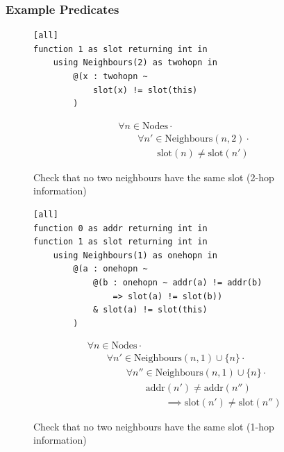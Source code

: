 \subsubsection{Example Predicates}
\label{sec:example-predicates}

\begin{figure}[H]
\begin{minipage}{.5\linewidth}
\begin{lstlisting}[language=Hoppy]
[all]
function 1 as slot returning int in
    using Neighbours(2) as twohopn in
        @(x : twohopn ~
            slot(x) != slot(this)
        )
\end{lstlisting}
\end{minipage}%
\begin{minipage}{.5\linewidth}
\begin{align*}
&				\forall n \in \text{Nodes} \cdot \\
& \hspace{2em}		\forall n' \in \text{Neighbours}(n, 2) \cdot \\
& \hspace{4em}				\text{slot}(n) \neq \text{slot}(n')
\end{align*}
\end{minipage}

\caption{Check that no two neighbours have the same slot (2-hop information)}
\label{fig:two-hop-slot-pred-lang}
\end{figure}

\begin{figure}[H]
\begin{minipage}{.5\linewidth}
\begin{lstlisting}[language=Hoppy]
[all]
function 0 as addr returning int in
function 1 as slot returning int in
    using Neighbours(1) as onehopn in
        @(a : onehopn ~
            @(b : onehopn ~ addr(a) != addr(b)
                => slot(a) != slot(b))
            & slot(a) != slot(this)
        )
\end{lstlisting}
\end{minipage}%
\begin{minipage}{.5\linewidth}
\begin{align*}
&				\forall n \in \text{Nodes} \cdot \\
& \hspace{2em}		\forall n' \in \text{Neighbours}(n, 1) \cup \{n\} \cdot \\
& \hspace{4em}			\forall n'' \in \text{Neighbours}(n, 1) \cup \{n\} \cdot \\
& \hspace{6em}				\text{addr}(n') \not= \text{addr}(n'') \\
& \hspace{8em}					\implies \text{slot}(n') \neq \text{slot}(n'')
\end{align*}
\end{minipage}
\caption{Check that no two neighbours have the same slot (1-hop information)}
\label{fig:one-hop-slot-pred-lang}
\end{figure}


